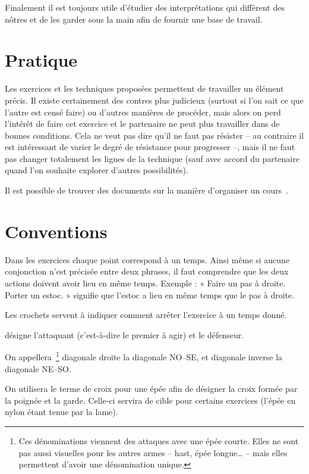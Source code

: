 Finalement il est toujours utile d'étudier des interprétations qui diffèrent des nôtres et de les garder sous la main afin de fournir une base de travail.


\section{Pratique}


Les exercices et les techniques proposées permettent de travailler un élément précis.
Il existe certainement des contres plus judicieux (surtout si l'on sait ce que l'autre est censé faire) ou d'autres manières de procéder, mais alors on perd l'intérêt de faire cet exercice et le partenaire ne peut plus travailler dans de bonnes conditions.
Cela ne veut pas dire qu'il ne faut pas résister – au contraire il est intéressant de varier le degré de résistance pour progresser –, mais il ne faut pas changer totalement les lignes de la technique (sauf avec accord du partenaire quand l'on souhaite explorer d'autres possibilités).

Il est possible de trouver des documents sur la manière d'organiser un cours~\cite{linnard:how_we_train}.


\section{Conventions}


Dans les exercices chaque point correspond à un temps. Ainsi même si aucune conjonction n'est précisée entre deux phrases, il faut comprendre que les deux actions doivent avoir lieu en même temps. Exemple : « Faire un pas à droite. Porter un estoc. » signifie que l'estoc a lieu en même temps que le pas à droite.

Les crochets servent à indiquer comment arrêter l'exercice à un temps donné.

\A désigne l'attaquant (c'est-à-dire le premier à agir) et \D le défenseur.

On appellera~\footnote{Ces dénominations viennent des attaques avec une épée courte. Elles ne sont pas aussi visuelles pour les autres armes – hast, épée longue… – mais elles permettent d'avoir une dénomination unique.} diagonale droite la diagonale NO–SE, et diagonale inverse la diagonale NE–SO.

On utilisera le terme de croix pour une épée afin de désigner la croix formée par la poignée et la garde.
Celle-ci servira de cible pour certains exercices (l'épée en nylon étant tenue par la lame).

